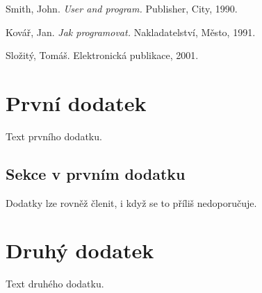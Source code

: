 \documentclass{article}
\begin{document}
\newpage
\begin{thebibliography}{MMM99}

  Smith, John. \emph{User and program.}
  Publisher, City, 1990.

  Kovář, Jan. \emph{Jak programovat.}
  Nakladatelství, Město, 1991.

  Složitý, Tomáš.
  Elektronická publikace, 2001.

\end{thebibliography}


\appendix
\newpage
\section{První dodatek}
Text prvního dodatku.

\subsection{Sekce v prvním dodatku}
Dodatky lze rovněž členit, i když se to příliš nedoporučuje.

\newpage
\section{Druhý dodatek}
Text druhého dodatku.


\renewcommand{\indexcolumns}{3}
\printindex
\end{document}
